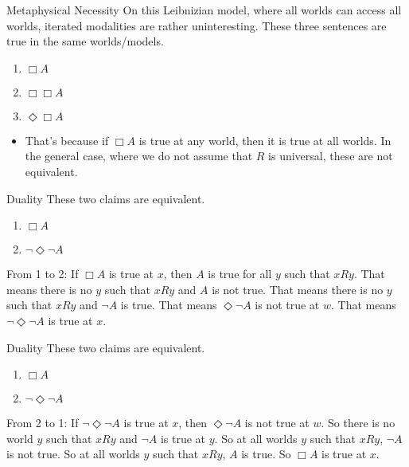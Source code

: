 \documentclass[
  14pt,
  letterpaper,
  ignorenonframetext,
  aspectratio=169,
  handout]{beamer}
\providecommand{\tightlist}{%
  \setlength{\itemsep}{0pt}\setlength{\parskip}{0pt}}\usepackage{longtable,booktabs,array}
\begin{document}
\begin{frame}{Metaphysical Necessity}
\protect\hypertarget{metaphysical-necessity}{}
On this Leibnizian model, where all worlds can access all worlds,
iterated modalities are rather uninteresting. These three sentences are
true in the same worlds/models.

\begin{enumerate}[<+->]
\tightlist
\item
  \(\Box A\)
\item
  \(\Box \Box A\)
\item
  \(\Diamond \Box A\)
\end{enumerate}

\begin{itemize}[<+->]
\tightlist
\item
  That's because if \(\Box A\) is true at any world, then it is true at
  all worlds. In the general case, where we do not assume that \(R\) is
  universal, these are not equivalent.
\end{itemize}
\end{frame}

\begin{frame}{Duality}
\protect\hypertarget{duality}{}
These two claims are equivalent.

\begin{enumerate}[<+->]
\tightlist
\item
  \(\Box A\)
\item
  \(\neg \Diamond \neg A\)
\end{enumerate}

From 1 to 2: If \(\Box A\) is true at \(x\), then \(A\) is true for all
\(y\) such that \(xRy\). That means there is no \(y\) such that \(xRy\)
and \(A\) is not true. That means there is no \(y\) such that \(xRy\)
and \(\neg A\) is true. That means \(\Diamond \neg A\) is not true at
\(w\). That means \(\neg \Diamond \neg A\) is true at \(x\).
\end{frame}

\begin{frame}{Duality}
\protect\hypertarget{duality-1}{}
These two claims are equivalent.

\begin{enumerate}[<+->]
\tightlist
\item
  \(\Box A\)
\item
  \(\neg \Diamond \neg A\)
\end{enumerate}

From 2 to 1: If \(\neg \Diamond \neg A\) is true at \(x\), then
\(\Diamond \neg A\) is not true at \(w\). So there is no world \(y\)
such that \(xRy\) and \(\neg A\) is true at \(y\). So at all worlds
\(y\) such that \(xRy\), \(\neg A\) is not true. So at all worlds \(y\)
such that \(xRy\), \(A\) is true. So \(\Box A\) is true at \(x\).
\end{frame}
\end{document}
